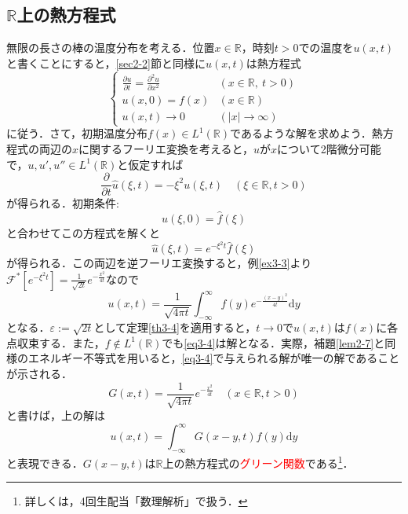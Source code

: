 \documentclass[a4j]{jsbook}
\numberwithin{theorem}{chapter}  %
\begin{document}
\subsection{\(\mathbb{R}\)上の熱方程式} \label{subsec3-9-1}
無限の長さの棒の温度分布を考える．位置\(x\in\mathbb{R}\)，時刻\(t>0\)での温度を\(u(x, t)\)と書くことにすると，\ref{sec2-2}節と同様に\(u(x, t)\)は熱方程式
\begin{equation*}
    \begin{cases}
    \frac{\partial u}{\partial t}=\frac{\partial^2 u}{\partial x^2} & (x\in\mathbb{R},\ t>0) \\
    u(x, 0)=f(x) & (x\in\mathbb{R}) \\
    u(x, t)\to 0 & (|x|\to\infty)
    \end{cases}
\end{equation*}
に従う．さて，初期温度分布\(f(x)\in L^1(\mathbb{R})\)であるような解を求めよう．熱方程式の両辺の\(x\)に関するフーリエ変換を考えると，\(u\)が\(x\)について2階微分可能で，\(u, u', u''\in L^1(\mathbb{R})\)と仮定すれば
\begin{equation*}
    \frac{\partial}{\partial t}\hat{u}(\xi, t)=-\xi^2u(\xi, t)\quad(\xi\in\mathbb{R}, t>0)
\end{equation*}
が得られる．初期条件:
\begin{equation*}
    \hat{u}(\xi, 0)=\hat{f}(\xi)
\end{equation*}
と合わせてこの方程式を解くと
\begin{equation*}
    \hat{u}(\xi, t)=e^{-\xi^2 t}\hat{f}(\xi)
\end{equation*}
が得られる．この両辺を逆フーリエ変換すると，例\ref{ex3-3}より\(\displaystyle\mathcal{F}^*\left[e^{-\xi^2 t}\right]=\frac{1}{\sqrt{2t}}e^{-\frac{x^2}{4t}}\)なので
\begin{equation}
    u(x, t)=\frac{1}{\sqrt{4\pi t}}\int_{-\infty}^\infty f(y)e^{-\frac{(x-y)^2}{4t}}\mathrm{d}y \label{eq3-4}
\end{equation}
となる．\(\varepsilon:=\sqrt{2t}\)として定理\ref{th3-4}を適用すると，\(t\to 0\)で\(u(x, t)\)は\(f(x)\)に各点収束する．また，\(f\notin L^1(\mathbb{R})\)でも\eqref{eq3-4}は解となる．実際，補題\ref{lem2-7}と同様のエネルギー不等式を用いると，\eqref{eq3-4}で与えられる解が唯一の解であることが示される．
\begin{equation*}
    G(x, t)=\frac{1}{\sqrt{4\pi t}}e^{-\frac{x^2}{4t}}\quad(x\in\mathbb{R}, t>0)
\end{equation*}
と書けば，上の解は
\begin{equation*}
    u(x, t)=\int_{-\infty}^\infty G(x-y, t)f(y)\mathrm{d}y
\end{equation*}
と表現できる．\(G(x-y, t)\)は\(\mathbb{R}\)上の熱方程式の\textcolor{red}{グリーン関数}である\footnote{詳しくは，4回生配当「数理解析」で扱う．}．
\end{document}
